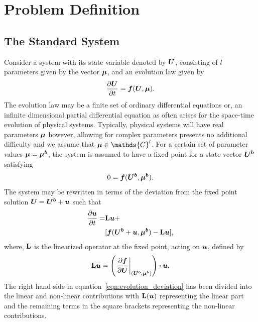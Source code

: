 \section{Problem Definition}
\label{sec:problem_setup}

\subsection{The Standard System}
\label{sec:standard_system}

Consider a system with its state variable denoted by $\boldsymbol{U}$, consisting of $l$ parameters given by the vector $\boldsymbol{\mu}$, and an evolution law given by
\begin{equation}
	\frac{\partial \boldsymbol{U}}{\partial t} = \boldsymbol{f}(\boldsymbol{U},\boldsymbol{\mu}).
	\label{eqn:evolution0}
\end{equation}
The evolution law may be a finite set of ordinary differential equations or, an infinite dimensional partial differential equation as often arises for the space-time evolution of physical systems. Typically, physical systems will have real parameters $\boldsymbol{\mu}$ however, allowing for complex parameters presents no additional difficulty and we assume that $\vecmu \in \mathds{C}^{l}$. 
For a certain set of parameter values $\boldsymbol{\mu} = \boldsymbol{\mu^{b}}$, the system is assumed to have a fixed point for a state vector $\boldsymbol{U^{b}}$ satisfying
\begin{equation}
	0 = \boldsymbol{f}(\boldsymbol{U^{b}},\boldsymbol{\mu^{b}}).
	\label{eqn:fixed_point}
\end{equation}
The system may be rewritten in terms of the deviation from the fixed point solution $\boldsymbol{U} =  \boldsymbol{U^{b}} + \boldsymbol{u}$ such that 
\begin{equation}
	\begin{split}
		\frac{\partial \boldsymbol{u}}{\partial t} =& \mathbf{L}\boldsymbol{u} + \\
		& [\boldsymbol{f}(\boldsymbol{U^{b}} + \boldsymbol{u},\boldsymbol{\mu^{b}}) - \mathbf{L}\boldsymbol{u}],
	\end{split}
	\label{eqn:evolution_deviation}
\end{equation}
where, $\mathbf{L}$ is the linearized operator at the fixed point, acting on $\boldsymbol{u}$, defined by
\begin{align}
	\mathbf{L}\boldsymbol{u} = \left(\left.\frac{\partial \boldsymbol{f}}{\partial \boldsymbol{U}}\right|_{(\boldsymbol{U^{b}},\boldsymbol{\mu^{b}})} \right)\boldsymbol{\cdot} \boldsymbol{u}.
	\label{eqn:linearized_operator_u}
\end{align}
The right hand side in equation~\eqref{eqn:evolution_deviation} has been divided into the linear and non-linear contributions with $\mathbf{L}(\boldsymbol{u})$ representing the linear part and the remaining terms in the square brackets representing the non-linear contributions.

